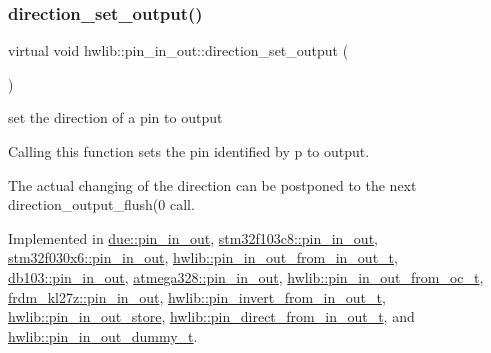 \subsubsection{\texorpdfstring{direction\+\_\+set\+\_\+output()}{direction\_set\_output()}}
{\footnotesize\ttfamily virtual void hwlib\+::pin\+\_\+in\+\_\+out\+::direction\+\_\+set\+\_\+output (\begin{DoxyParamCaption}{ }\end{DoxyParamCaption})\hspace{0.3cm}{\ttfamily [pure virtual]}}

set the direction of a pin to output

Calling this function sets the pin identified by p to output.

The actual changing of the direction can be postponed to the next direction\+\_\+output\+\_\+flush(0 call. 

Implemented in \hyperlink{classdue_1_1pin__in__out_a45f7cf2e7f71638337f82ecf1852f884}{due\+::pin\+\_\+in\+\_\+out}, \hyperlink{classstm32f103c8_1_1pin__in__out_ac5e1d7c630e1b25467c224110ed9de1c}{stm32f103c8\+::pin\+\_\+in\+\_\+out}, \hyperlink{classstm32f030x6_1_1pin__in__out_a67a4cc5a76ccf6070d6aad1b5c7bfc01}{stm32f030x6\+::pin\+\_\+in\+\_\+out}, \hyperlink{classhwlib_1_1pin__in__out__from__in__out__t_a6c0f6e7f37e52cc1d6fec7932a024cb1}{hwlib\+::pin\+\_\+in\+\_\+out\+\_\+from\+\_\+in\+\_\+out\+\_\+t}, \hyperlink{classdb103_1_1pin__in__out_a55b94d79329ccbe2a263e954cccc1ba9}{db103\+::pin\+\_\+in\+\_\+out}, \hyperlink{classatmega328_1_1pin__in__out_acb994ef07be4c36fc8742d67f95ac6d4}{atmega328\+::pin\+\_\+in\+\_\+out}, \hyperlink{classhwlib_1_1pin__in__out__from__oc__t_a792d6b72134b11f0e9ffe9989b8287e6}{hwlib\+::pin\+\_\+in\+\_\+out\+\_\+from\+\_\+oc\+\_\+t}, \hyperlink{classfrdm__kl27z_1_1pin__in__out_a329bd2ea5a7fc1516ceacc8708a1226e}{frdm\+\_\+kl27z\+::pin\+\_\+in\+\_\+out}, \hyperlink{classhwlib_1_1pin__invert__from__in__out__t_ae790759c546b1cd54c55b6aa3ec84600}{hwlib\+::pin\+\_\+invert\+\_\+from\+\_\+in\+\_\+out\+\_\+t}, \hyperlink{classhwlib_1_1pin__in__out__store_a18435aa514bf63d61e0bbb17a29e0502}{hwlib\+::pin\+\_\+in\+\_\+out\+\_\+store}, \hyperlink{classhwlib_1_1pin__direct__from__in__out__t_a1bd7746b4b114c1ea73d214006fc79bc}{hwlib\+::pin\+\_\+direct\+\_\+from\+\_\+in\+\_\+out\+\_\+t}, and \hyperlink{classhwlib_1_1pin__in__out__dummy__t_a065ca763bd00d4cd6bf3fd11610779db}{hwlib\+::pin\+\_\+in\+\_\+out\+\_\+dummy\+\_\+t}.

\mbox{\label{classhwlib_1_1pin__in__out_a5207c9e30f0c88e4c052952397c2da88}} 

